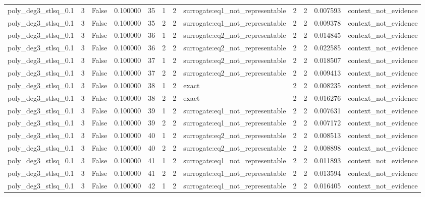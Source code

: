 \begin{tabular}{lrrrrrrlrrrl}
poly\_deg3\_stlsq\_0.1 & 3 & False & 0.100000 & 35 & 1 & 2 & surrogate:eq1\_not\_representable & 2 & 2 & 0.007593 & context\_not\_evidence \\
poly\_deg3\_stlsq\_0.1 & 3 & False & 0.100000 & 35 & 2 & 2 & surrogate:eq1\_not\_representable & 2 & 2 & 0.009378 & context\_not\_evidence \\
poly\_deg3\_stlsq\_0.1 & 3 & False & 0.100000 & 36 & 1 & 2 & surrogate:eq2\_not\_representable & 2 & 2 & 0.014845 & context\_not\_evidence \\
poly\_deg3\_stlsq\_0.1 & 3 & False & 0.100000 & 36 & 2 & 2 & surrogate:eq2\_not\_representable & 2 & 2 & 0.022585 & context\_not\_evidence \\
poly\_deg3\_stlsq\_0.1 & 3 & False & 0.100000 & 37 & 1 & 2 & surrogate:eq2\_not\_representable & 2 & 2 & 0.018507 & context\_not\_evidence \\
poly\_deg3\_stlsq\_0.1 & 3 & False & 0.100000 & 37 & 2 & 2 & surrogate:eq2\_not\_representable & 2 & 2 & 0.009413 & context\_not\_evidence \\
poly\_deg3\_stlsq\_0.1 & 3 & False & 0.100000 & 38 & 1 & 2 & exact & 2 & 2 & 0.008235 & context\_not\_evidence \\
poly\_deg3\_stlsq\_0.1 & 3 & False & 0.100000 & 38 & 2 & 2 & exact & 2 & 2 & 0.016276 & context\_not\_evidence \\
poly\_deg3\_stlsq\_0.1 & 3 & False & 0.100000 & 39 & 1 & 2 & surrogate:eq1\_not\_representable & 2 & 2 & 0.007631 & context\_not\_evidence \\
poly\_deg3\_stlsq\_0.1 & 3 & False & 0.100000 & 39 & 2 & 2 & surrogate:eq1\_not\_representable & 2 & 2 & 0.007172 & context\_not\_evidence \\
poly\_deg3\_stlsq\_0.1 & 3 & False & 0.100000 & 40 & 1 & 2 & surrogate:eq2\_not\_representable & 2 & 2 & 0.008513 & context\_not\_evidence \\
poly\_deg3\_stlsq\_0.1 & 3 & False & 0.100000 & 40 & 2 & 2 & surrogate:eq2\_not\_representable & 2 & 2 & 0.008898 & context\_not\_evidence \\
poly\_deg3\_stlsq\_0.1 & 3 & False & 0.100000 & 41 & 1 & 2 & surrogate:eq1\_not\_representable & 2 & 2 & 0.011893 & context\_not\_evidence \\
poly\_deg3\_stlsq\_0.1 & 3 & False & 0.100000 & 41 & 2 & 2 & surrogate:eq1\_not\_representable & 2 & 2 & 0.013594 & context\_not\_evidence \\
poly\_deg3\_stlsq\_0.1 & 3 & False & 0.100000 & 42 & 1 & 2 & surrogate:eq1\_not\_representable & 2 & 2 & 0.016405 & context\_not\_evidence \\

\end{tabular}
